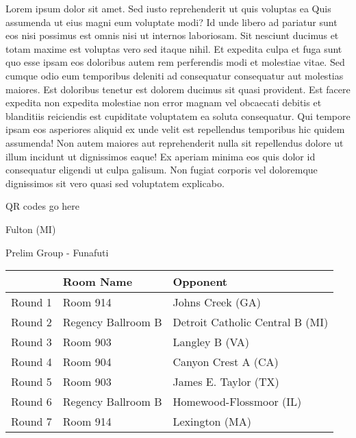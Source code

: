 \documentclass{article}%
\begin{document}
\vspace*{8pt}%
\linebreak%
\newline%
\newline%
Lorem ipsum dolor sit amet. Sed iusto reprehenderit ut quis voluptas ea Quis assumenda ut eius magni eum voluptate modi? Id unde libero ad pariatur sunt eos nisi possimus est omnis nisi ut internos laboriosam. Sit nesciunt ducimus et totam maxime est voluptas vero sed itaque nihil. Et expedita culpa et fuga sunt quo esse ipsam eos doloribus autem rem perferendis modi et molestiae vitae.\newline%
\newline%
Sed cumque odio eum temporibus deleniti ad consequatur consequatur aut molestias maiores. Est doloribus tenetur est dolorem ducimus sit quasi provident. Est facere expedita non expedita molestiae non error magnam vel obcaecati debitis et blanditiis reiciendis est cupiditate voluptatem ea soluta consequatur. Qui tempore ipsam eos asperiores aliquid ex unde velit est repellendus temporibus hic quidem assumenda!\newline%
\newline%
Non autem maiores aut reprehenderit nulla sit repellendus dolore ut illum incidunt ut dignissimos eaque! Ex aperiam minima eos quis dolor id consequatur eligendi ut culpa galisum. Non fugiat corporis vel doloremque dignissimos sit vero quasi sed voluptatem explicabo.\newline%
\newline%
%
\vspace*{30pt}%
\begin{center}%
\begin{Huge}%
QR codes go here%
\end{Huge}%
\end{center}%
\newpage%
%
\begin{center}%
\begin{Huge}%
Fulton (MI)%
\end{Huge}%
\vspace*{8pt}%
\linebreak%
\begin{Large}%
Prelim Group {-} Funafuti%
\end{Large}%
\end{center}%
\begin{tabularx}{\textwidth}{|c|Y|Y|}%
\hline%
&Room Name&Opponent\\%
\hline%
Round 1&Room 914&Johns Creek (GA)\\%
Round 2&Regency Ballroom B&Detroit Catholic Central B (MI)\\%
Round 3&Room 903&Langley B (VA)\\%
Round 4&Room 904&Canyon Crest A (CA)\\%
Round 5&Room 903&James E. Taylor (TX)\\%
Round 6&Regency Ballroom B&Homewood{-}Flossmoor (IL)\\%
Round 7&Room 914&Lexington (MA)\\%
\hline%
\end{tabularx}%
\end{document}
